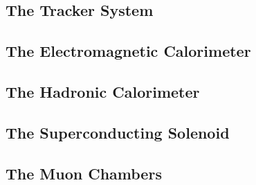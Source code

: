 \subsection{The Tracker System}
\subsection{The Electromagnetic Calorimeter}
\subsection{The Hadronic Calorimeter}
\subsection{The Superconducting Solenoid}
\subsection{The Muon Chambers}
